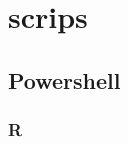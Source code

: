\section{scrips}

\subsection{Powershell}\label{apx:code:datacollect}



\subsubsection{R}\label{apx:code:dataanal}